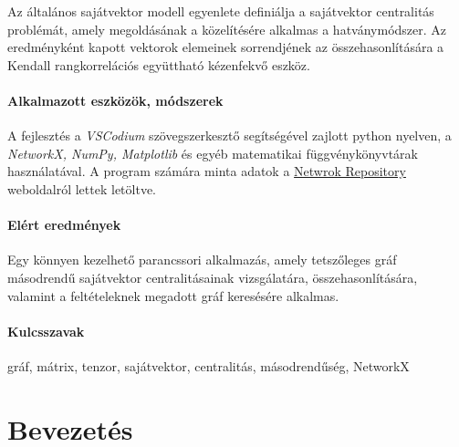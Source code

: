 \documentclass[12pt,numbers=noenddot]{report}
\begin{document}
Az általános sajátvektor modell egyenlete definiálja a sajátvektor centralitás
problémát, amely megoldásának a közelítésére alkalmas a hatványmódszer.
Az eredményként kapott vektorok elemeinek sorrendjének az összehasonlítására 
a Kendall rangkorrelációs együttható kézenfekvő eszköz.

\subsubsection*{Alkalmazott eszközök, módszerek}

A fejlesztés a \textit{VSCodium} szövegszerkesztő segítségével
zajlott python nyelven, a \textit{NetworkX, NumPy, Matplotlib} és egyéb 
matematikai függvénykönyvtárak használatával. A program számára minta adatok
a \href{https://networkrepository.com/index.php}{Netwrok Repository} weboldalról
lettek letöltve.


\subsubsection*{Elért eredmények}

Egy könnyen kezelhető parancssori alkalmazás, amely tetszőleges gráf 
másodrendű sajátvektor centralitásainak vizsgálatára, összehasonlítására, 
valamint a feltételeknek megadott gráf keresésére alkalmas.

\subsubsection*{Kulcsszavak}

gráf, mátrix, tenzor, sajátvektor, centralitás, másodrendűség, NetworkX


\renewcommand{\contentsname}{Tartalomjegyzék}
\tableofcontents


\chapter{Bevezetés}
\pagestyle{fancy}
\end{document}
